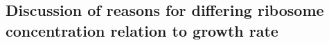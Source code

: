 \subsection{Discussion of reasons for differing ribosome concentration relation to growth rate}
\label{ribosomeconc} 